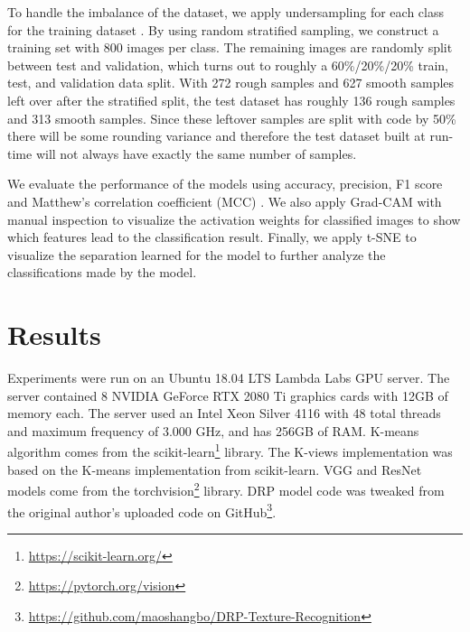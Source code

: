 \documentclass{aci}
\numberwithin{equation}{section}
\begin{document}
To handle the imbalance of the dataset, we apply undersampling for each class
for the training dataset \cite{tiittanen_novel_2022}. By using random stratified
sampling, we construct a training set with 800 images per class. The remaining
images are randomly split between test and validation, which turns out to
roughly a 60\%/20\%/20\% train, test, and validation data split. With 272 rough
samples and 627 smooth samples left over after the stratified split, the test
dataset has roughly 136 rough samples and 313 smooth samples. Since these
leftover samples are split with code by 50\% there will be some rounding
variance and therefore the test dataset built at run-time will not always have
exactly the same number of samples.


We evaluate the performance of the models using accuracy, precision, F1 score
and Matthew's correlation coefficient (MCC) \cite{chicco_matthews_2021}. We also
apply Grad-CAM with manual inspection to visualize the activation weights for
classified images to show which features lead to the classification result.
Finally, we apply t-SNE to visualize the separation learned for the model to
further analyze the classifications made by the model.

\section{Results}


Experiments were run on an Ubuntu 18.04 LTS Lambda Labs GPU server. The server
contained 8 NVIDIA GeForce RTX 2080 Ti graphics cards with 12GB of memory each.
The server used an Intel Xeon Silver 4116 with 48 total threads and maximum
frequency of 3.000 GHz, and has 256GB of RAM. K-means algorithm comes from the
scikit-learn\footnote{\url{https://scikit-learn.org/}} library. The K-views
implementation was based on the K-means implementation from scikit-learn. VGG
and ResNet models come from the
torchvision\footnote{\url{https://pytorch.org/vision}} library. DRP model code
was tweaked from the original author's uploaded code on
GitHub\footnote{\url{https://github.com/maoshangbo/DRP-Texture-Recognition}}.
\end{document}
